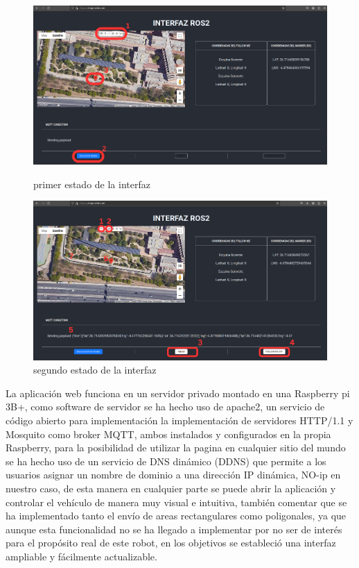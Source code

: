 \begin{figure}[htbp]
  \centering
  \begin{minipage}[b]{0.45\textwidth}
    \centering
    \includegraphics[width=\textwidth]{images/interfaz_1.png}
    \caption{primer estado de la interfaz}
    \label{fig:interfaz_1}
  \end{minipage}
  \hfill
  \begin{minipage}[b]{0.45\textwidth}
    \centering
    \includegraphics[width=\textwidth]{images/interfaz_2.png}
    \caption{segundo estado de la interfaz}
    \label{fig:interfaz_2}
  \end{minipage}
\end{figure}

La aplicación web funciona en un servidor privado montado en una Raspberry pi 3B+, como software de servidor se ha hecho uso de apache2, 
un servicio de código abierto para implementación la implementación de servidores HTTP/1.1 y Mosquito como broker MQTT, ambos instalados y configurados en la propia 
Raspberry, para la posibilidad de utilizar la pagina en cualquier sitio del mundo se ha hecho uso de un servicio de DNS dinámico (DDNS) 
que permite a los usuarios asignar un nombre de dominio a una dirección IP dinámica, NO-ip en nuestro caso, de esta manera en cualquier 
parte se puede abrir la aplicación y controlar el vehículo de manera muy visual e intuitiva, también 
comentar que se ha implementado tanto el envío de areas rectangulares como poligonales, ya que aunque esta 
funcionalidad no se ha llegado a implementar por no ser de interés para el propósito real de este robot, en los objetivos se estableció 
una interfaz ampliable y fácilmente actualizable.


